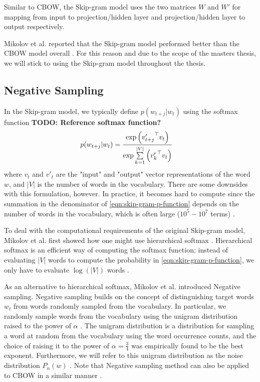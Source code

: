 Similar to CBOW, the Skip-gram model uses the two matrices $W$ and $W'$ for mapping from input to projection/hidden layer and projection/hidden layer to output respectively.


Mikolov et al. reported that the Skip-gram model performed better than the CBOW model overall \cite{mikolov2013a}. For this reason and due to the scope of the masters thesis, we will stick to using the Skip-gram model throughout the thesis.

\subsection{Negative Sampling}


In the Skip-gram model, we typically define $p(w_{t+j} | w_t)$ using the softmax function \cite{mikolov2013b} \textbf{TODO: Reference softmax function?}
\begin{align}
    p(w_{t+j} | w_t)
    &= \frac{\exp{ \left( {v'_{t+j}}^\top v_t \right) }} {\exp{  \sum\limits_{k=1}^{|V|} \left( {v'_k}^\top v_t \right) }}
    \label{eqn:skip-gram-p-function}
\end{align}
where $v_t$ and $v'_t$ are the "input" and "output" vector representations of the word $w$, and $|V|$ is the number of words in the vocabulary. There are some downsides with this formulation, however. In practice, it becomes hard to compute since the summation in the denominator of \cref{eqn:skip-gram-p-function} depends on the number of words in the vocabulary, which is often large ($10^5 - 10^7$ terms) \cite{mikolov2013b}.

To deal with the computational requirements of the original Skip-gram model, Mikolov et al. first showed how one might use hierarchical softmax \cite{mikolov2013b}. Hierarchical softmax is an efficient way of computing the softmax function; instead of evaluating $|V|$ words to compute the probability in \cref{eqn:skip-gram-p-function}, we only have to evaluate $\log \left( |V| \right)$ words \cite{mikolov2013b}.

As an alternative to hierarchical softmax, Mikolov et al. introduced Negative sampling. Negative sampling builds on the concept of distinguishing target words $w_t$ from words randomly sampled from the vocabulary. In particular, we randomly sample words from the vocabulary using the unigram distribution raised to the power of $\alpha$ \cite{mikolov2013b}. The unigram distribution is a distribution for sampling a word at random from the vocabulary using the word occurrence counts, and the choice of raising it to the power of $\alpha = \frac{3}{4}$ was empirically found to be the best exponent. Furthermore, we will refer to this unigram distribution as the noise distribution $P_n(w)$ \cite{mikolov2013b}. Note that Negative sampling method can also be applied to CBOW in a similar manner \cite{mikolov2013b}.


